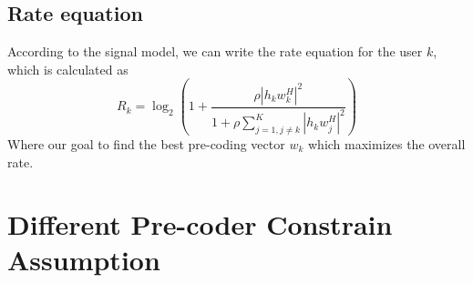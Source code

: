 \subsection{Rate equation}
According to the signal model, we can write the rate equation for the user $k$, which is calculated as
\begin{equation}
    R_k=\log_2\left(1+\frac{{\rho\left|h_k w_k^H\right|}^2}{1+\rho \sum_{j=1,j\neq k}^{K}{\left|h_k w_j^H\right|^2}}\right)
\end{equation}
Where our goal to find the best pre-coding vector $w_k$ which maximizes the overall rate.

\section{Different Pre-coder Constrain Assumption}
